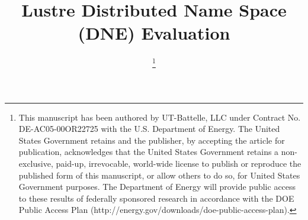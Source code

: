 \documentclass[conference,compsoc]{IEEEtran}
\begin{document}
%
\title{Lustre Distributed Name Space (DNE) Evaluation}


\author{
\thanks{

This manuscript has been authored by UT-Battelle, LLC under Contract No.
DE-AC05-00OR22725 with the U.S. Department of Energy. The United States
Government retains and the publisher, by accepting the article for publication,
acknowledges that the United States Government retains a non-exclusive,
paid-up, irrevocable, world-wide license to publish or reproduce the published
form of this manuscript, or allow others to do so, for United States Government
purposes. The Department of Energy will provide public access to these results
of federally sponsored research in accordance with the DOE Public Access Plan
(http://energy.gov/downloads/doe-public-access-plan).

}
}


%
\end{document}
